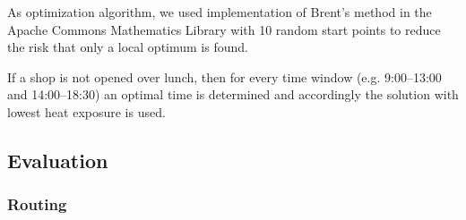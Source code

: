 As optimization algorithm, we used implementation of Brent's method in the Apache Commons Mathematics Library \parencite{ASF2016} with 10 random start points to reduce the risk that only a local optimum is found.

If a shop is not opened over lunch, then for every time window (e.g. 9:00--13:00 and 14:00--18:30) an optimal time is determined and accordingly the solution with lowest heat exposure is used.

\subsection{Evaluation}

\subsubsection{Routing}

